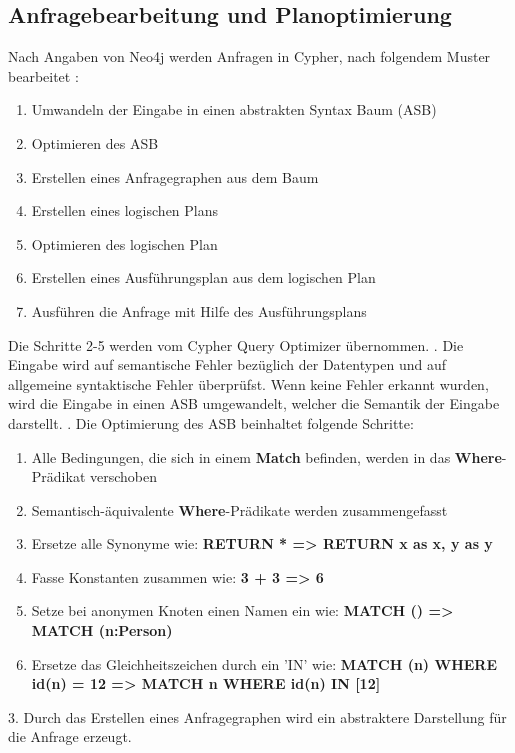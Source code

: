 \subsection{Anfragebearbeitung und Planoptimierung}
Nach Angaben von Neo4j werden Anfragen in Cypher, nach folgendem Muster bearbeitet \parencite{Optimizer}:
\begin{enumerate}
	\item Umwandeln der Eingabe in einen abstrakten Syntax Baum (ASB)
	\item Optimieren des ASB
	\item Erstellen eines Anfragegraphen aus dem Baum
	\item Erstellen eines logischen Plans
	\item Optimieren des logischen Plan 
	\item Erstellen eines Ausführungsplan aus dem logischen Plan
	\item Ausführen die Anfrage mit Hilfe des Ausführungsplans  
\end{enumerate}
Die Schritte 2-5 werden vom Cypher Query Optimizer übernommen. \newline {}. Die Eingabe wird auf semantische Fehler bezüglich der Datentypen und auf allgemeine syntaktische Fehler überprüfst. Wenn keine Fehler erkannt wurden, wird die Eingabe in einen ASB umgewandelt, welcher die Semantik der Eingabe darstellt. \newline
{}. Die Optimierung des ASB beinhaltet folgende Schritte: 
\begin{enumerate}[label=(\roman*)]
	\item Alle Bedingungen, die sich in einem \textbf{Match} befinden, werden in das \textbf{Where}-Prädikat verschoben
	\item  Semantisch-äquivalente \textbf{Where}-Prädikate werden zusammengefasst
	\item Ersetze alle Synonyme wie: \textbf{RETURN * => RETURN x as x, y as y}
	\item Fasse Konstanten zusammen wie: \textbf{3 + 3 => 6}
	\item Setze bei anonymen Knoten einen Namen ein  wie: \textbf{ MATCH () => MATCH (n:Person)}
	\item Ersetze das Gleichheitszeichen durch ein 'IN' wie: \textbf{MATCH (n) WHERE id(n) = 12 => MATCH n WHERE id(n) IN [12]}
\end{enumerate}
3. Durch das Erstellen eines Anfragegraphen wird ein abstraktere Darstellung für die Anfrage erzeugt.\newline \newline
